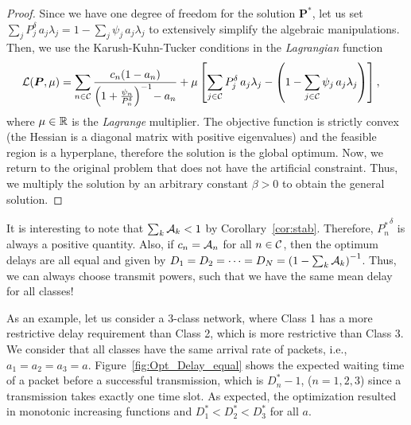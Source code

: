 \begin{proof}
	Since we have one degree of freedom for the solution $\bm{P}^*$, let us set $\sum_j P_j^\delta\,a_j\lambda_j = 1 - \sum_j \psi_j\,a_j\lambda_j$ to extensively simplify the algebraic manipulations. Then, we use the Karush-Kuhn-Tucker conditions \cite[Section~3.3.1]{bertsekas1999nonlinear} in the \emph{Lagrangian} function
    \begin{equation*}
    \begin{split}
    	\cal{L}(\bm{P},\mu) 
    	    &= \sum_{n\in\cal{C}} \frac{c_n (1-a_n)}
        	    {\left( 1 + \frac{\psi_n}{P_n^\delta}\right)^{-1}\! - a_n} + \mu\left[ \sum_{j\in\cal{C}} P_j^\delta\,a_j\lambda_j 
            	- \left(1 - \sum_{j\in\cal{C}} \psi_j\,a_j\lambda_j\right) \right],
    \end{split}
    \end{equation*}
    where $\mu\in\R$ is the \emph{Lagrange} multiplier.
    The objective function is strictly convex (the Hessian is a diagonal matrix with positive eigenvalues) and the feasible region is a hyperplane, therefore the solution is the global optimum.
    Now, we return to the original problem that does not have the artificial constraint. Thus, we multiply the solution by an arbitrary constant $\beta>0$ to obtain the general solution.
\end{proof}

It is interesting to note that ${\sum_k\cal{A}_k<1}$ by Corollary~\ref{cor:stab}. Therefore, ${P_n^*}^\delta$ is always a positive quantity.
%
Also, if $c_n = \cal{A}_n$ for all $n\in\cal{C}$, then the optimum delays are all equal and given by ${D_1 = D_2 = \cdots = D_N = \left( 1 - \sum_k \cal{A}_k \right)^{-1}}$. Thus, we can always choose transmit powers, such that we have the same mean delay for all classes!


As an example, let us consider a 3-class network, where Class 1 has a more restrictive delay requirement than Class 2, which is more restrictive than Class 3. We consider that all classes have the same arrival rate of packets, i.e., $a_1=a_2=a_3=a$. Figure~\ref{fig:Opt_Delay_equal} shows the expected waiting time of a packet before a successful transmission, which is $D_n^*-1$, ($n = 1,2,3$) since a transmission takes exactly one time slot. As expected, the optimization resulted in monotonic increasing functions and $D_1^* < D_2^* < D_3^*$ for all $a$.


